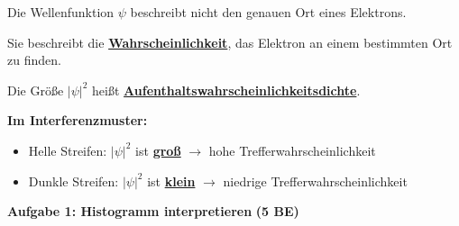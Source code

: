 \documentclass[11pt,a4paper]{article}
\newcommand{\lueckelsg}[1]{\textcolor{loesung}{\underline{\textbf{#1}}}}
\begin{document}
\begin{tcolorbox}[kasten={Kasten 2: Die Wahrscheinlichkeitswelle}]

Die Wellenfunktion $\psi$ beschreibt nicht den genauen Ort eines Elektrons.

Sie beschreibt die \lueckelsg{Wahrscheinlichkeit}, das Elektron an einem bestimmten Ort zu finden.

\vspace{0.5em}

Die Größe $|\psi|^2$ heißt \lueckelsg{Aufenthaltswahrscheinlichkeitsdichte}.

\vspace{0.8em}

\textbf{Im Interferenzmuster:}
\begin{itemize}[leftmargin=1.5cm, itemsep=2pt]
\item Helle Streifen: $|\psi|^2$ ist \lueckelsg{groß} $\rightarrow$ hohe Trefferwahrscheinlichkeit
\item Dunkle Streifen: $|\psi|^2$ ist \lueckelsg{klein} $\rightarrow$ niedrige Trefferwahrscheinlichkeit
\end{itemize}

\end{tcolorbox}

\vspace{1em}


{\large\textbf{Aufgabe 1: Histogramm interpretieren}} \hfill \textbf{(5 BE)}

\vspace{0.5em}
\end{document}
